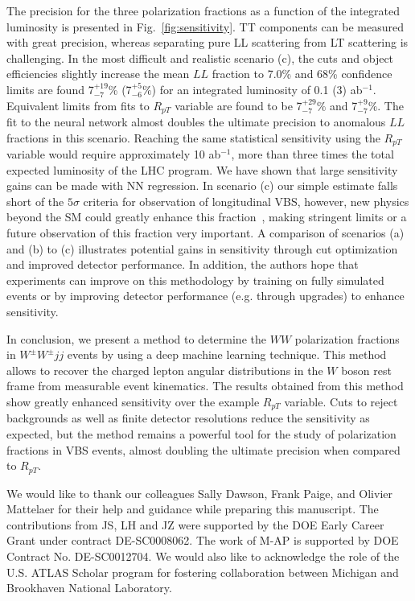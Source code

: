 \documentclass[aps,prl,twocolumn,showpacs,superscriptaddress,groupeaddress,floatfix]{revtex4}
\def\ssWW{\ensuremath{ W^{\pm}W^{\pm}jj }\xspace}
\begin{document}
The precision for the three polarization fractions as a function of
the integrated luminosity is presented in Fig.~\ref{fig:sensitivity}.
TT components can be measured with great precision, whereas separating
pure LL scattering from LT scattering is challenging.  In the most
difficult and realistic scenario (c), the cuts and object efficiencies
slightly increase the mean $LL$ fraction to 7.0\% and 68\% confidence
limits are found 7$^{+19}_{-7}$\% (7$^{+5}_{-6}\%$) for an integrated
luminosity of 0.1 (3) ab$^{-1}$.  Equivalent limits from fits to
$R_{pT}$ variable are found to be 7$^{+29}_{-7}\%$ and
7$^{+9}_{-7}\%$. The fit to the neural network almost doubles the
ultimate precision to anomalous $LL$ fractions in this
scenario. Reaching the same statistical sensitivity using the $R_{pT}$
variable would require approximately 10 ab$^{-1}$, more than three
times the total expected luminosity of the LHC program. We have shown
that large sensitivity gains can be made with NN regression. In
scenario (c) our simple estimate falls short of the $5\sigma$ criteria
for observation of longitudinal VBS, however, new physics beyond the
SM could greatly enhance this fraction~\cite{VLVLBSM}, making
stringent limits or a future observation of this fraction very
important. A comparison of scenarios (a) and (b) to (c) illustrates
potential gains in sensitivity through cut optimization and improved
detector performance. In addition, the authors hope that experiments
can improve on this methodology by training on fully simulated events
or by improving detector performance (e.g. through upgrades) to
enhance sensitivity.

In conclusion, we present a method to determine the $WW$ polarization fractions in
\ssWW events by using a deep machine learning technique.  This method
allows to recover the charged lepton angular distributions in the $W$
boson rest frame from measurable event kinematics.  The
results obtained from this method show greatly enhanced sensitivity over
the example $R_{pT}$ variable.  Cuts to reject
backgrounds as well as finite detector resolutions reduce the sensitivity as
expected, but the method remains a powerful tool for the study of
polarization fractions in VBS events, almost doubling the ultimate precision when compared to $R_{pT}$.

We would like to thank our colleagues Sally Dawson, Frank Paige, and Olivier Mattelaer for their help and guidance while preparing this manuscript.
The contributions from JS, LH and JZ were supported by the DOE Early Career Grant under contract DE-SC0008062. The work of M-AP is supported by DOE Contract No. DE-SC0012704. We would also like to acknowledge the role of the U.S. ATLAS Scholar program for fostering collaboration between Michigan and Brookhaven National Laboratory.
\end{document}
